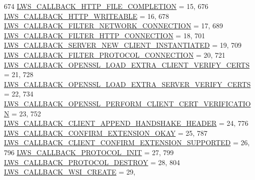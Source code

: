 \begin{DoxyCode}
674         \hyperlink{group__usercb_ggad62860e19975ba4c4af401c3cdb6abf7aa627548e1296e654fcfab463ec3c9587}{LWS\_CALLBACK\_HTTP\_FILE\_COMPLETION}                      = 15,
676         \hyperlink{group__usercb_ggad62860e19975ba4c4af401c3cdb6abf7afedadfb3cde37a8ea4c84ed535f26d09}{LWS\_CALLBACK\_HTTP\_WRITEABLE}                          = 16,
678         \hyperlink{group__usercb_ggad62860e19975ba4c4af401c3cdb6abf7a026502768778b8d79d62dd0fe4375fc6}{LWS\_CALLBACK\_FILTER\_NETWORK\_CONNECTION}                    = 
      17,
689         \hyperlink{group__usercb_ggad62860e19975ba4c4af401c3cdb6abf7a75199176c82c1a56e4a6bbf1cc30c12c}{LWS\_CALLBACK\_FILTER\_HTTP\_CONNECTION}                  = 18,
701         \hyperlink{group__usercb_ggad62860e19975ba4c4af401c3cdb6abf7ae9734e1d7af2abf291665ce9e4a728d3}{LWS\_CALLBACK\_SERVER\_NEW\_CLIENT\_INSTANTIATED}          = 
      19,
709         \hyperlink{group__usercb_ggad62860e19975ba4c4af401c3cdb6abf7accd8753672d319a30b4b4c2fb775e84d}{LWS\_CALLBACK\_FILTER\_PROTOCOL\_CONNECTION}                  = 
      20,
721         \hyperlink{group__usercb_ggad62860e19975ba4c4af401c3cdb6abf7ae4986291b7a810fe290851d73bebeb1c}{LWS\_CALLBACK\_OPENSSL\_LOAD\_EXTRA\_CLIENT\_VERIFY\_CERTS}  
      = 21,
728         \hyperlink{group__usercb_ggad62860e19975ba4c4af401c3cdb6abf7a06006e98d27e1e884364d88317f83493}{LWS\_CALLBACK\_OPENSSL\_LOAD\_EXTRA\_SERVER\_VERIFY\_CERTS}  
      = 22,
734         \hyperlink{group__usercb_ggad62860e19975ba4c4af401c3cdb6abf7ae5ad65d779b7eab32ab67ceff91a3bac}{LWS\_CALLBACK\_OPENSSL\_PERFORM\_CLIENT\_CERT\_VERIFICATION}      
      = 23,
752         \hyperlink{group__usercb_ggad62860e19975ba4c4af401c3cdb6abf7a909cc2a7018864b0b71abacc4058fd8f}{LWS\_CALLBACK\_CLIENT\_APPEND\_HANDSHAKE\_HEADER}          = 
      24,
776         \hyperlink{group__usercb_ggad62860e19975ba4c4af401c3cdb6abf7a390da3639296660a78cc1a5dcb19037e}{LWS\_CALLBACK\_CONFIRM\_EXTENSION\_OKAY}                  = 25,
787         \hyperlink{group__usercb_ggad62860e19975ba4c4af401c3cdb6abf7a1ce5b22039ca37ee224d00047596ea46}{LWS\_CALLBACK\_CLIENT\_CONFIRM\_EXTENSION\_SUPPORTED}          
      = 26,
796         \hyperlink{group__usercb_ggad62860e19975ba4c4af401c3cdb6abf7ad5d34583e3556e153eda91620b48cc49}{LWS\_CALLBACK\_PROTOCOL\_INIT}                            = 27,
799         \hyperlink{group__usercb_ggad62860e19975ba4c4af401c3cdb6abf7a54269ca88508e6efd3afdb9d360a9caa}{LWS\_CALLBACK\_PROTOCOL\_DESTROY}                              = 28,
804         \hyperlink{group__usercb_ggad62860e19975ba4c4af401c3cdb6abf7afd8fd77a1cc9405fcb4f26915d7f2d01}{LWS\_CALLBACK\_WSI\_CREATE}                                  = 29,

\end{DoxyCode}
